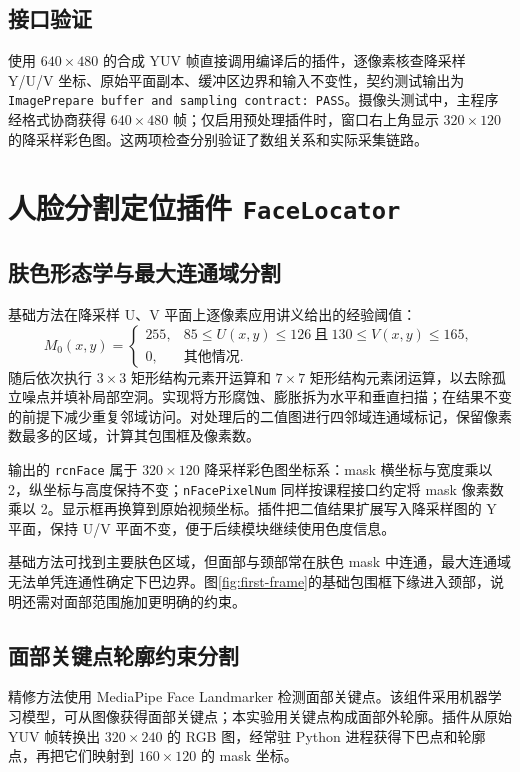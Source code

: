 \documentclass[UTF8,a4paper,12pt,fontset=windows]{ctexart}
\begin{document}
\subsection{接口验证}
使用 \(640\times480\) 的合成 YUV 帧直接调用编译后的插件，逐像素核查降采样 Y/U/V 坐标、原始平面副本、缓冲区边界和输入不变性，契约测试输出为 \texttt{ImagePrepare buffer and sampling contract: PASS}。摄像头测试中，主程序经格式协商获得 \(640\times480\) 帧；仅启用预处理插件时，窗口右上角显示 \(320\times120\) 的降采样彩色图。这两项检查分别验证了数组关系和实际采集链路。

\section{人脸分割定位插件 \texttt{FaceLocator}}
\subsection{肤色形态学与最大连通域分割}
基础方法在降采样 U、V 平面上逐像素应用讲义给出的经验阈值：
\begin{equation}
  M_0(x,y)=
  \begin{cases}
    255,&85\leq U(x,y)\leq126\ \text{且}\ 130\leq V(x,y)\leq165,\\
    0,&\text{其他情况}.
  \end{cases}
\end{equation}
随后依次执行 \(3\times3\) 矩形结构元素开运算和 \(7\times7\) 矩形结构元素闭运算，以去除孤立噪点并填补局部空洞。实现将方形腐蚀、膨胀拆为水平和垂直扫描；在结果不变的前提下减少重复邻域访问。对处理后的二值图进行四邻域连通域标记，保留像素数最多的区域，计算其包围框及像素数。

输出的 \texttt{rcnFace} 属于 \(320\times120\) 降采样彩色图坐标系：mask 横坐标与宽度乘以 2，纵坐标与高度保持不变；\texttt{nFacePixelNum} 同样按课程接口约定将 mask 像素数乘以 2。显示框再换算到原始视频坐标。插件把二值结果扩展写入降采样图的 Y 平面，保持 U/V 平面不变，便于后续模块继续使用色度信息。

基础方法可找到主要肤色区域，但面部与颈部常在肤色 mask 中连通，最大连通域无法单凭连通性确定下巴边界。图\ref{fig:first-frame}的基础包围框下缘进入颈部，说明还需对面部范围施加更明确的约束。

\subsection{面部关键点轮廓约束分割}
精修方法使用 MediaPipe Face Landmarker 检测面部关键点。该组件采用机器学习模型，可从图像获得面部关键点\cite{mediapipe-guide}；本实验用关键点构成面部外轮廓\cite{mediapipe-connections}。插件从原始 YUV 帧转换出 \(320\times240\) 的 RGB 图，经常驻 Python 进程获得下巴点和轮廓点，再把它们映射到 \(160\times120\) 的 mask 坐标。
\end{document}
